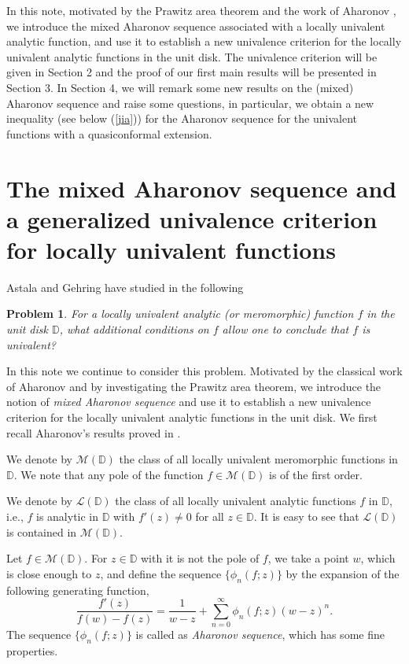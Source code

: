 \documentclass[10pt]{amsart}
\newtheorem{problem}[theorem]{Problem}
\theoremstyle{definition}
\theoremstyle{remark}
\numberwithin{equation}{section}
\begin{document}
In this note, motivated by the Prawitz area theorem and the work of Aharonov \cite{Ah}, we introduce the mixed Aharonov sequence associated with a locally univalent analytic function, and use it to establish a new univalence criterion for the locally univalent analytic functions in the unit disk.  The univalence criterion will be given in Section 2 and the proof of our first main results will be presented in Section 3.  In Section 4, we will remark some new results on the (mixed) Aharonov sequence and raise some questions, in particular, we obtain a new inequality (see below (\ref{jia})) for the Aharonov sequence for the univalent functions with a quasiconformal extension.
 
\section{\bf {The mixed Aharonov sequence and a generalized univalence criterion for locally univalent functions}}

Astala and Gehring have studied in \cite{AG} the following 
\begin{problem}
For a locally univalent analytic (or meromorphic) function $f$ in the unit disk $\mathbb{D}$,  what additional conditions on $f$ allow one to conclude that $f$ is univalent?
\end{problem}

In this note we continue to consider this problem.  Motivated by the classical work of Aharonov \cite{Ah} and by investigating the Prawitz area theorem, we introduce the notion of {\em mixed Aharonov sequence}  and use it to establish a new univalence criterion for the locally univalent analytic functions in the unit disk. We first recall Aharonov's results proved in \cite{Ah}. 

We denote by $\mathcal{M}(\mathbb{D})$ the class of all locally univalent meromorphic functions in $\mathbb{D}$. We note that any pole of the function $f\in \mathcal{M}(\mathbb{D})$  is of the first order. 

We denote by $\mathcal{L}(\mathbb{D})$ the class of all locally univalent analytic functions $f$ in $\mathbb{D}$, i.e., $f$ is analytic in $\mathbb{D}$ with $f'(z)\neq 0$ for all $z\in \mathbb{D}$. It is easy to see that $\mathcal{L}(\mathbb{D})$ is contained in $\mathcal{M}(\mathbb{D})$.

Let $f\in \mathcal{M}(\mathbb{D})$. For $z\in \mathbb{D}$ with it is not the pole of $f$, we take a point $w$, which is close enough to $z$, and define the sequence $\{\phi_n(f; z)\}$ by the expansion of the following generating function,
\begin{equation}\label{inv}
\frac{f'(z)}{f(w)-f(z)}=\frac{1}{w-z}+\sum_{n=0}^{\infty}\phi_n(f; z)(w-z)^n.
\end{equation}
The sequence $\{\phi_n(f; z)\}$ is called as {\em Aharonov sequence}, which has some fine properties. 
\end{document}
